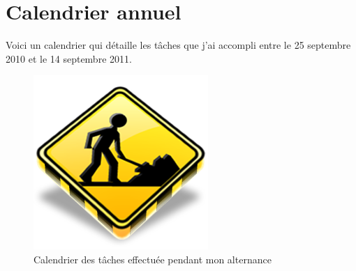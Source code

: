 \chapter{Calendrier annuel}
Voici un calendrier qui détaille les tâches que j'ai accompli entre le 25 septembre 2010 et le 14 septembre 2011.

\begin{figure}[h!]
	\begin{center}
		\includegraphics[scale=1]{Contenu/Annexes/Images/Calendrier.png}
	\end{center}

	\caption{Calendrier des tâches effectuée pendant mon alternance}
	\label{calendrier}
\end{figure}
